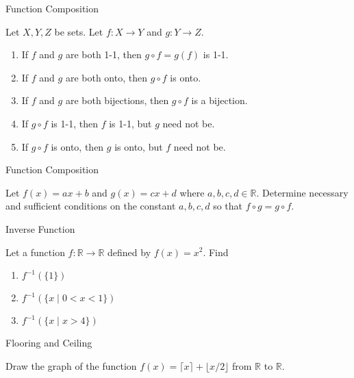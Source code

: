 \documentclass{beamer}
\begin{document}
\begin{frame}[t]{Function Composition}
    \begin{theorem}
        Let $X,Y,Z$ be sets. Let $f: X \to Y$ and $g: Y \to Z$.
        \begin{enumerate}
            \item If $f$ and $g$ are both 1-1, then $g \circ f = g(f)$ is 1-1.
            \item If $f$ and $g$ are both onto, then $g \circ  f$ is onto.
            \item If $f$ and $g$ are both bijections, then $g \circ f$ is a bijection.
            \item If $g \circ f$ is 1-1, then $f$ is 1-1, but $g$ need not be. 
            \item If $g \circ f$ is onto, then $g$ is onto, but $f$ need not be. 
        \end{enumerate}
    \end{theorem}
\end{frame}

\begin{frame}{}
\end{frame}

\begin{frame}[t]{Function Composition}
    \begin{example}
        Let $f(x) = ax + b$ and $g(x) = cx + d$ where $a,b,c,d \in \mathbb{R}$. Determine necessary and sufficient conditions on the constant $a,b,c,d$ so that $f \circ g = g \circ f$.
    \end{example}
\end{frame}

\begin{frame}[t]{Inverse Function}
    \begin{example}
        Let a function $f: \mathbb{R} \to \mathbb{R}$ defined by $f(x) = x^2$. Find
        \begin{enumerate}
            \item $f^{-1}(\{1\})$
            \item $f^{-1}(\{x \mid 0 < x < 1\})$
            \item $f^{-1}(\{x \mid x > 4\})$
        \end{enumerate}
    \end{example}
\end{frame}

\begin{frame}[t]{Flooring and Ceiling}
    \begin{example}
        Draw the graph of the function $f(x) = \lceil x \rceil + \lfloor x/2 \rfloor$ from $\mathbb{R}$ to $\mathbb{R}$.
    \end{example}
\end{frame}
\end{document}
